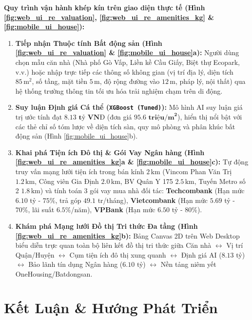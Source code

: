 \documentclass[12pt,a4paper]{report}
\begin{document}
\textbf{Quy trình vận hành khép kín trên giao diện thực tế (Hình \ref{fig:web_ui_re_valuation}, \ref{fig:web_ui_re_amenities_kg} \& \ref{fig:mobile_ui_house}):}
\begin{enumerate}[leftmargin=1.5em]
    \item \textbf{Tiếp nhận Thuộc tính Bất động sản (Hình \ref{fig:web_ui_re_valuation} \& \ref{fig:mobile_ui_house}a):} Người dùng chọn mẫu căn nhà (Nhà phố Gò Vấp, Liền kề Cầu Giấy, Biệt thự Ecopark, v.v.) hoặc nhập trực tiếp các thông số không gian (vị trí địa lý, diện tích $85\,\text{m}^2$, số tầng, mặt tiền $5\,\text{m}$, độ rộng đường vào $12\,\text{m}$, pháp lý, nội thất) qua hệ thống trường thông tin tối ưu hóa trải nghiệm chạm trên di động.
    \item \textbf{Suy luận Định giá Cá thể (\texttt{XGBoost (Tuned)}):} Mô hình AI suy luận giá trị ước tính đạt $\mathbf{8.13\text{ tỷ VNĐ}}$ (đơn giá $\mathbf{95.6\text{ triệu/m}^2}$), hiển thị nổi bật với các thẻ chỉ số tóm lược về diện tích sàn, quy mô phòng và phân khúc bất động sản (Hình \ref{fig:mobile_ui_house}b).
    \item \textbf{Khai phá Tiện ích Đô thị \& Gói Vay Ngân hàng (Hình \ref{fig:web_ui_re_amenities_kg}a \& \ref{fig:mobile_ui_house}c):} Tự động truy vấn mạng lưới tiện ích trong bán kính $2\,\text{km}$ (Vincom Phan Văn Trị $1.2\,\text{km}$, Công viên Gia Định $2.0\,\text{km}$, BV Quân Y 175 $2.5\,\text{km}$, Tuyến Metro số 2 $1.8\,\text{km}$) và tính toán 3 gói vay mua nhà đối tác: \textbf{Techcombank} (Hạn mức $6.10$ tỷ - $75\%$, trả góp $49.1$ tr/tháng), \textbf{Vietcombank} (Hạn mức $5.69$ tỷ - $70\%$, lãi suất $6.5\%$/năm), \textbf{VPBank} (Hạn mức $6.50$ tỷ - $80\%$).
    \item \textbf{Khám phá Mạng lưới Đồ thị Tri thức Đa tầng (Hình \ref{fig:web_ui_re_amenities_kg}b):} Bảng Canvas 2D trên Web Desktop biểu diễn trực quan toàn bộ liên kết đồ thị tri thức giữa Căn nhà $\longleftrightarrow$ Vị trí Quận/Huyện $\longleftrightarrow$ Cụm tiện ích đô thị xung quanh $\longleftrightarrow$ Định giá AI ($8.13$ tỷ) $\longleftrightarrow$ Bảo lãnh tín dụng Ngân hàng ($6.10$ tỷ) $\longleftrightarrow$ Nền tảng niêm yết OneHousing/Batdongsan.
\end{enumerate}

\newpage

\chapter*{Kết Luận \& Hướng Phát Triển}
\end{document}
